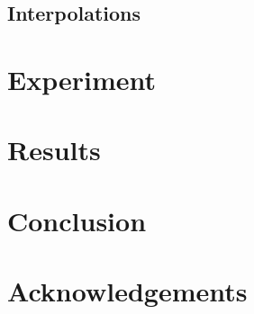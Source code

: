 \documentclass[conference]{acmsiggraph}
\begin{document}
	\subsection{Interpolations}

\section{Experiment}

\section{Results}

\section{Conclusion}

\section*{Acknowledgements}



\end{document}
